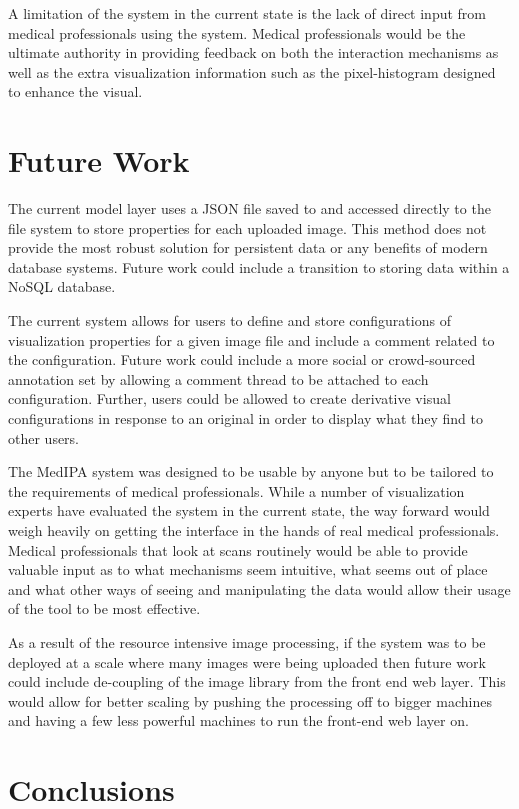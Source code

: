 \documentclass[annual]{acmsiggraph}
\begin{document}
A limitation of the system in the current state is the lack of direct input from medical professionals using the system.  Medical professionals would be the ultimate authority in providing feedback on both the interaction mechanisms as well as the extra visualization information such as the pixel-histogram designed to enhance the visual.

\section{Future Work} 
The current model layer uses a JSON file saved to and accessed directly to the file system to store properties for each uploaded image.  This method does not provide the most robust solution for persistent data or any benefits of modern database systems.  Future work could include a transition to storing data within a NoSQL database.

The current system allows for users to define and store configurations of visualization properties for a given image file and include a comment related to the configuration.  Future work could include a more social or crowd-sourced annotation set by allowing a comment thread to be attached to each configuration.  Further, users could be allowed to create derivative visual configurations in response to an original in order to display what they find to other users.

The MedIPA system was designed to be usable by anyone but to be tailored to the requirements of medical professionals.  While a number of visualization experts have evaluated the system in the current state, the way forward would weigh heavily on getting the interface in the hands of real medical professionals.  Medical professionals that look at scans routinely would be able to provide valuable input as to what mechanisms seem intuitive, what seems out of place and what other ways of seeing and manipulating the data would allow their usage of the tool to be most effective.

As a result of the resource intensive image processing, if the system was to be deployed at a scale where many images were being uploaded then future work could include de-coupling of the image library from the front end web layer.  This would allow for better scaling by pushing the processing off to bigger machines and having a few less powerful machines to run the front-end web layer on.

\section{Conclusions}
\end{document}
